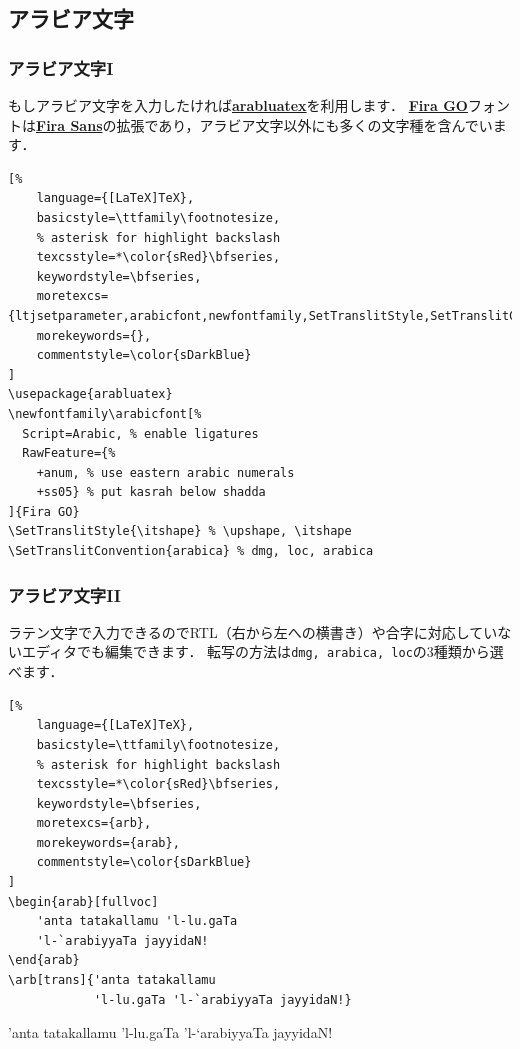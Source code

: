 \documentclass[
    12pt,
    unicode]{beamer}
\begin{document}
\subsection{アラビア文字}
\begin{frame}[fragile]
\frametitle{アラビア文字I}
    もしアラビア文字を入力したければ\href{https://ctan.org/pkg/arabluatex?lang=en}{\textbf{arabluatex}}を利用します．
    \href{https://bboxtype.com/typefaces/FiraGO/}{\textbf{Fira GO}}フォントは\href{https://bboxtype.com/typefaces/FiraSans/}{\textbf{Fira Sans}}の拡張であり，アラビア文字以外にも多くの文字種を含んでいます．

\begin{leftbar}
\begin{lstlisting}[%
    language={[LaTeX]TeX},
    basicstyle=\ttfamily\footnotesize,
    % asterisk for highlight backslash
    texcsstyle=*\color{sRed}\bfseries,
    keywordstyle=\bfseries,
    moretexcs={ltjsetparameter,arabicfont,newfontfamily,SetTranslitStyle,SetTranslitConvention},
    morekeywords={},
    commentstyle=\color{sDarkBlue}
]
\usepackage{arabluatex}
\newfontfamily\arabicfont[%
  Script=Arabic, % enable ligatures
  RawFeature={%
    +anum, % use eastern arabic numerals
    +ss05} % put kasrah below shadda
]{Fira GO}
\SetTranslitStyle{\itshape} % \upshape, \itshape
\SetTranslitConvention{arabica} % dmg, loc, arabica
\end{lstlisting}
\end{leftbar}
\end{frame}

\begin{frame}[fragile]
\frametitle{アラビア文字II}
ラテン文字で入力できるのでRTL（右から左への横書き）や合字に対応していないエディタでも編集できます．
転写の方法は\texttt{dmg, arabica, loc}の3種類から選べます．

\begin{leftbar}
\begin{lstlisting}[%
    language={[LaTeX]TeX},
    basicstyle=\ttfamily\footnotesize,
    % asterisk for highlight backslash
    texcsstyle=*\color{sRed}\bfseries,
    keywordstyle=\bfseries,
    moretexcs={arb},
    morekeywords={arab},
    commentstyle=\color{sDarkBlue}
]
\begin{arab}[fullvoc]
    'anta tatakallamu 'l-lu.gaTa
    'l-`arabiyyaTa jayyidaN!
\end{arab}
\arb[trans]{'anta tatakallamu
            'l-lu.gaTa 'l-`arabiyyaTa jayyidaN!}
\end{lstlisting}
\end{leftbar}

\begin{arab}[fullvoc]
    'anta tatakallamu 'l-lu.gaTa 'l-`arabiyyaTa jayyidaN!
\end{arab}

\bigskip

\end{frame}
\end{document}
